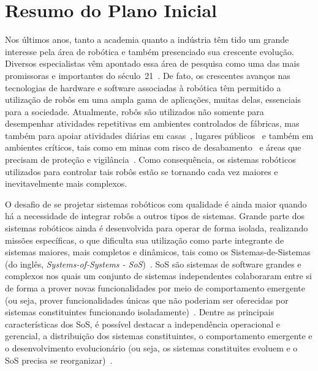 \documentclass[12pt]{report}
\begin{document}
%
\geraTitulo
\folhaDeRosto
{}
\tableofcontents
\clearpage

\sectionfont{\scshape}
\chapter{Resumo do Plano Inicial}
Nos últimos anos, tanto a academia quanto a indústria têm tido um grande interesse pela área de robótica e também presenciado sua crescente evolução. Diversos especialistas vêm apontado essa área de pesquisa como uma das mais promissoras e importantes do século~21~\cite{Tomatis2011}. De fato, os crescentes avanços nas tecnologias de hardware e software associadas à robótica têm permitido a utilização de robôs em uma ampla gama de aplicações, muitas delas, essenciais para a sociedade. Atualmente, robôs são utilizados não somente para desempenhar atividades repetitivas em ambientes controlados de fábricas, mas também para apoiar atividades diárias em casas~\cite{iRobot2014}, lugares públicos~\cite{Shiomi06IHR} e também em ambientes críticos, tais como em minas com risco de desabamento~\cite{Thrun04AEAM} e áreas que precisam de proteção e vigilância~\cite{Beard06DCAS}. Como consequência, os sistemas robóticos utilizados para controlar tais robôs estão se tornando cada vez maiores e inevitavelmente mais complexos. 

O desafio de se projetar sistemas robóticos com qualidade é ainda maior quando há a necessidade de integrar robôs a outros tipos de sistemas. Grande parte dos sistemas robóticos ainda é desenvolvida para operar de forma isolada, realizando missões específicas, o que dificulta sua utilização como parte integrante de sistemas maiores, mais completos e dinâmicos, tais como os Sistemas-de-Sistemas (do inglês, \textit{Systems-of-Systems - SoS})~\cite{Dagli06SoSA}. SoS são sistemas de software grandes e complexos nos quais um conjunto de sistemas independentes colaboraram entre si de forma a prover novas funcionalidades por meio de comportamento emergente (ou seja, prover funcionalidades únicas que não poderiam ser oferecidas por sistemas constituintes funcionando isoladamente)~\cite{Dagli06SoSA}. Dentre as principais características dos SoS, é possível destacar a independência operacional e gerencial, a distribuição  dos sistemas constituintes, o comportamento emergente e o desenvolvimento evolucionário (ou seja, os sistemas constituites evoluem e o SoS precisa se reorganizar)~\cite{Maier98APSoS}. 
\end{document}
